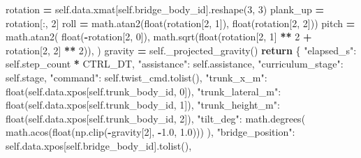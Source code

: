 \documentclass[
  american,
  11pt,
  letterpaper,
]{article}
\newenvironment{Shaded}{\begin{snugshade}}{\end{snugshade}}
\newcommand{\BuiltInTok}[1]{#1}
\newcommand{\ControlFlowTok}[1]{\textcolor[rgb]{0.13,0.29,0.53}{\textbf{#1}}}
\newcommand{\DecValTok}[1]{\textcolor[rgb]{0.00,0.00,0.81}{#1}}
\newcommand{\FloatTok}[1]{\textcolor[rgb]{0.00,0.00,0.81}{#1}}
\newcommand{\NormalTok}[1]{#1}
\newcommand{\OperatorTok}[1]{\textcolor[rgb]{0.81,0.36,0.00}{\textbf{#1}}}
\newcommand{\StringTok}[1]{\textcolor[rgb]{0.31,0.60,0.02}{#1}}
\newcommand{\VariableTok}[1]{\textcolor[rgb]{0.00,0.00,0.00}{#1}}
\renewenvironment{Shaded}{\par\smallskip}{\par\smallskip}
\begin{document}
\begin{Shaded}
\begin{Highlighting}[]
\NormalTok{        rotation }\OperatorTok{=} \VariableTok{self}\NormalTok{.data.xmat[}\VariableTok{self}\NormalTok{.bridge\_body\_id].reshape(}\DecValTok{3}\NormalTok{, }\DecValTok{3}\NormalTok{)}
\NormalTok{        plank\_up }\OperatorTok{=}\NormalTok{ rotation[:, }\DecValTok{2}\NormalTok{]}
\NormalTok{        roll }\OperatorTok{=}\NormalTok{ math.atan2(}\BuiltInTok{float}\NormalTok{(rotation[}\DecValTok{2}\NormalTok{, }\DecValTok{1}\NormalTok{]), }\BuiltInTok{float}\NormalTok{(rotation[}\DecValTok{2}\NormalTok{, }\DecValTok{2}\NormalTok{]))}
\NormalTok{        pitch }\OperatorTok{=}\NormalTok{ math.atan2(}
            \BuiltInTok{float}\NormalTok{(}\OperatorTok{{-}}\NormalTok{rotation[}\DecValTok{2}\NormalTok{, }\DecValTok{0}\NormalTok{]),}
\NormalTok{            math.sqrt(}\BuiltInTok{float}\NormalTok{(rotation[}\DecValTok{2}\NormalTok{, }\DecValTok{1}\NormalTok{] }\OperatorTok{**} \DecValTok{2} \OperatorTok{+}\NormalTok{ rotation[}\DecValTok{2}\NormalTok{, }\DecValTok{2}\NormalTok{] }\OperatorTok{**} \DecValTok{2}\NormalTok{)),}
\NormalTok{        )}
\NormalTok{        gravity }\OperatorTok{=} \VariableTok{self}\NormalTok{.\_projected\_gravity()}
        \ControlFlowTok{return}\NormalTok{ \{}
            \StringTok{"elapsed\_s"}\NormalTok{: }\VariableTok{self}\NormalTok{.step\_count }\OperatorTok{*}\NormalTok{ CTRL\_DT,}
            \StringTok{"assistance"}\NormalTok{: }\VariableTok{self}\NormalTok{.assistance,}
            \StringTok{"curriculum\_stage"}\NormalTok{: }\VariableTok{self}\NormalTok{.stage,}
            \StringTok{"command"}\NormalTok{: }\VariableTok{self}\NormalTok{.twist\_cmd.tolist(),}
            \StringTok{"trunk\_x\_m"}\NormalTok{: }\BuiltInTok{float}\NormalTok{(}\VariableTok{self}\NormalTok{.data.xpos[}\VariableTok{self}\NormalTok{.trunk\_body\_id, }\DecValTok{0}\NormalTok{]),}
            \StringTok{"trunk\_lateral\_m"}\NormalTok{: }\BuiltInTok{float}\NormalTok{(}\VariableTok{self}\NormalTok{.data.xpos[}\VariableTok{self}\NormalTok{.trunk\_body\_id, }\DecValTok{1}\NormalTok{]),}
            \StringTok{"trunk\_height\_m"}\NormalTok{: }\BuiltInTok{float}\NormalTok{(}\VariableTok{self}\NormalTok{.data.xpos[}\VariableTok{self}\NormalTok{.trunk\_body\_id, }\DecValTok{2}\NormalTok{]),}
            \StringTok{"tilt\_deg"}\NormalTok{: math.degrees(}
\NormalTok{                math.acos(}\BuiltInTok{float}\NormalTok{(np.clip(}\OperatorTok{{-}}\NormalTok{gravity[}\DecValTok{2}\NormalTok{], }\OperatorTok{{-}}\FloatTok{1.0}\NormalTok{, }\FloatTok{1.0}\NormalTok{)))}
\NormalTok{            ),}
            \StringTok{"bridge\_position"}\NormalTok{: }\VariableTok{self}\NormalTok{.data.xpos[}\VariableTok{self}\NormalTok{.bridge\_body\_id].tolist(),}

\end{Highlighting}
\end{Shaded}
\end{document}
